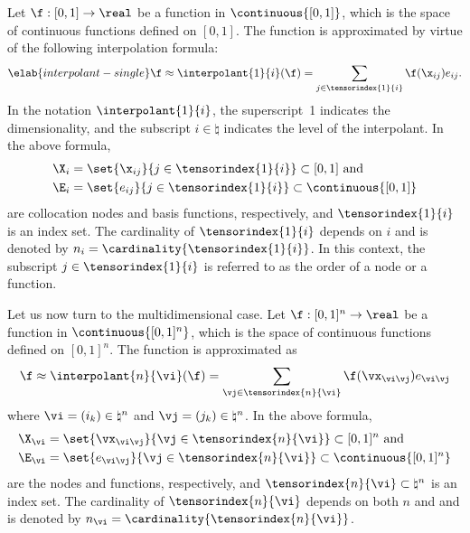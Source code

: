Let $\f: [0, 1] \to \real$ be a function in $\continuous{[0, 1]}$, which is the
space of continuous functions defined on $[0, 1]$. The function is approximated
by virtue of the following interpolation formula:
\begin{equation} \elab{interpolant-single}
  \f \approx \interpolant{1}{i}(\f)
  = \sum_{j \in \tensorindex{1}{i}} \f(\x_{ij}) e_{ij}.
\end{equation}
In the notation $\interpolant{1}{i}$, the superscript~1 indicates the
dimensionality, and the subscript $i \in \natural$ indicates the level of the
interpolant. In the above formula,
\begin{align*}
  & \X_i = \set{\x_{ij}}{j \in \tensorindex{1}{i}} \subset [0, 1] \text{ and} \\
  & \E_i = \set{e_{ij}}{j \in \tensorindex{1}{i}} \subset \continuous{[0, 1]}
\end{align*}
are collocation nodes and basis functions, respectively, and
$\tensorindex{1}{i}$ is an index set. The cardinality of $\tensorindex{1}{i}$
depends on $i$ and is denoted by $n_i = \cardinality{\tensorindex{1}{i}}$. In
this context, the subscript $j \in \tensorindex{1}{i}$ is referred to as the
order of a node or a function.

Let us now turn to the multidimensional case. Let $\f: [0, 1]^n \to \real$ be a
function in $\continuous{[0, 1]^n}$, which is the space of continuous functions
defined on $[0, 1]^n$. The function is approximated as
\[
  \f \approx \interpolant{n}{\vi}(\f)
  = \sum_{\vj \in \tensorindex{n}{\vi}} \f(\vx_{\vi \vj}) e_{\vi \vj}
\]
where $\vi = (i_k) \in \natural^n$ and $\vj = (j_k) \in \natural^n$. In the
above formula,
\begin{align*}
  & \X_{\vi} = \set{\vx_{\vi \vj}}{\vj \in \tensorindex{n}{\vi}} \subset [0, 1]^n \text{ and} \\
  & \E_{\vi} = \set{e_{\vi \vj}}{\vj \in \tensorindex{n}{\vi}} \subset \continuous{[0, 1]^n}
\end{align*}
are the nodes and functions, respectively, and $\tensorindex{n}{\vi} \subset
\natural^n$ is an index set. The cardinality of $\tensorindex{n}{\vi}$ depends
on both $n$ and \vi and is denoted by $n_{\vi} =
\cardinality{\tensorindex{n}{\vi}}$.

